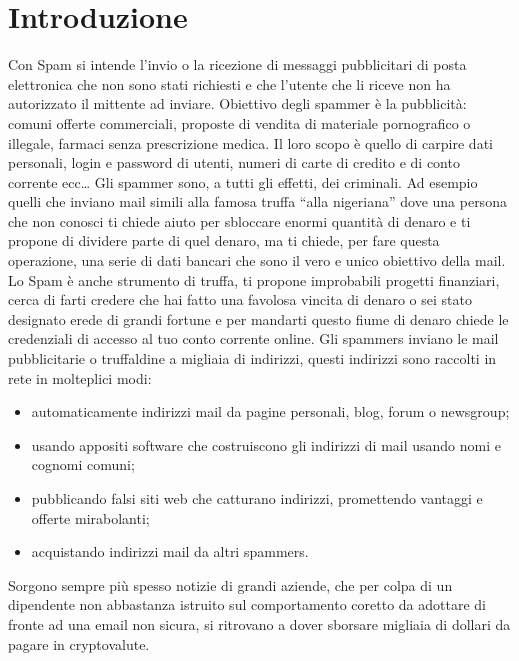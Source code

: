 \documentclass[12pt,a4paper]{article}
\begin{document}
\section{Introduzione}
Con Spam si intende l’invio o la ricezione di messaggi pubblicitari di posta elettronica che non sono stati richiesti e che l’utente che li riceve non ha autorizzato il mittente ad inviare.
\hfill \break \break
Obiettivo degli spammer è la pubblicità: comuni offerte commerciali, proposte di vendita di materiale pornografico o illegale, farmaci senza prescrizione medica. Il loro scopo è quello di carpire dati personali, login e password di utenti, numeri di carte di credito e di conto corrente ecc…
\hfill \break \break
Gli spammer sono, a tutti gli effetti, dei criminali. Ad esempio quelli che inviano mail simili alla famosa truffa “alla nigeriana” dove una persona che non conosci ti chiede aiuto per sbloccare enormi  quantità di denaro e ti propone di dividere parte di quel denaro, ma ti chiede, per fare questa operazione, una serie di dati bancari che sono il vero e unico obiettivo della mail.
\hfill \break \break
Lo Spam è anche strumento di truffa, ti propone improbabili progetti finanziari, cerca di farti credere che hai fatto una favolosa vincita di denaro o sei stato designato erede di grandi fortune e per mandarti questo fiume di denaro chiede  le credenziali di accesso al tuo conto corrente online.
\hfill \break \break
Gli spammers inviano le mail pubblicitarie o truffaldine a migliaia di indirizzi, questi indirizzi sono raccolti in rete in molteplici modi:
\begin{itemize}
    \item automaticamente indirizzi mail da pagine personali, blog, forum o newsgroup;
\end{itemize}
\begin{itemize}
    \item usando appositi software che costruiscono gli indirizzi di mail usando nomi e cognomi comuni;
\end{itemize}
\begin{itemize}
    \item pubblicando falsi siti web che catturano indirizzi, promettendo vantaggi e offerte mirabolanti;
\end{itemize}
\begin{itemize}
    \item acquistando indirizzi mail da altri spammers.
\end{itemize}

Sorgono sempre più spesso notizie di grandi aziende, che per colpa di un dipendente non abbastanza istruito sul comportamento coretto da adottare di fronte ad una email non sicura, si ritrovano a dover sborsare migliaia di dollari da pagare in cryptovalute.
\end{document}
